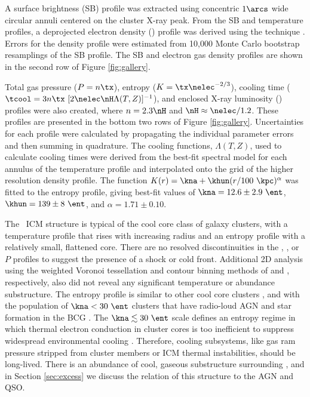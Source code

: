 \documentclass[useAMS,usenatbib]{mn2e}
\begin{document}
A surface brightness (SB) profile was extracted using concentric
$1\arcs$ wide circular annuli centered on the cluster X-ray peak. From
the SB and temperature profiles, a deprojected electron density
(\nelec) profile was derived using the \citet{kriss83} technique
\citep[see][for more detail]{accept}. Errors for the density profile
were estimated from 10,000 Monte Carlo bootstrap resamplings of the SB
profile. The SB and electron gas density profiles are shown in the
second row of Figure \ref{fig:gallery}.

Total gas pressure ($P = n \tx$), entropy ($K = \tx\nelec^{-2/3}$),
cooling time ($\tcool = 3n\tx~[2\nelec \nH \Lambda(T,Z)]^{-1}$), and
enclosed X-ray luminosity (\lx) profiles were also created, where $n =
2.3 \nH$ and $\nH \approx \nelec/1.2$. These profiles are presented in
the bottom two rows of Figure \ref{fig:gallery}. Uncertainties for
each profile were calculated by propagating the individual parameter
errors and then summing in quadrature. The cooling functions,
$\Lambda(T,Z)$, used to calculate cooling times were derived from the
best-fit spectral model for each annulus of the temperature profile
and interpolated onto the grid of the higher resolution density
profile. The function $K(r) = \kna +\khun (r/100 ~\kpc)^{\alpha}$ was
fitted to the entropy profile, giving best-fit values of $\kna = 12.6
\pm 2.9 ~\ent$, $\khun = 139 \pm 8 ~\ent$, and $\alpha = 1.71 \pm
0.10$.

The \rxj\ ICM structure is typical of the cool core class of galaxy
clusters, with a temperature profile that rises with increasing radius
and an entropy profile with a relatively small, flattened core. There
are no resolved discontinuities in the \tx, \nelec, or $P$ profiles to
suggest the presence of a shock or cold front. Additional 2D analysis
using the weighted Voronoi tessellation and contour binning methods of
\citet{wvt} and \citet{2006MNRAS.371..829S}, respectively, also did
not reveal any significant temperature or abundance substructure. The
entropy profile is similar to other cool core clusters \citep{accept},
and with the population of $\kna < 30 ~\ent$ clusters that have
radio-loud AGN and star formation in the BCG \citep{haradent,
  rafferty08}. The $\kna \la 30 ~\ent$ scale defines an entropy regime
in which thermal electron conduction in cluster cores is too
inefficient to suppress widespread environmental cooling
\citep{conduction}. Therefore, cooling subsystems, like gas ram
pressure stripped from cluster members or ICM thermal instabilities,
should be long-lived. There is an abundance of cool, gaseous
substructure surrounding \irs, and in Section \ref{sec:excess} we
discuss the relation of this structure to the AGN and QSO.
\end{document}
